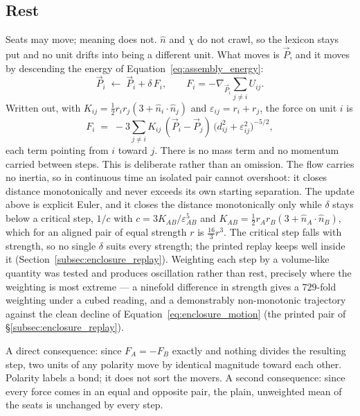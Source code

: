\documentclass[12pt, a4paper]{article}
\begin{document}
\subsection{Rest}
\label{subsec:enclosure_rest}
Seats may move; meaning does not. $\hat n$ and $\chi$ do not crawl,
so the lexicon stays put and no unit drifts into being a different
unit. What moves is $\vec P$, and it moves by descending the energy
of Equation~\eqref{eq:assembly_energy}:
\begin{equation}
    \vec P_i \;\leftarrow\; \vec P_i + \delta\,F_i,
    \qquad
    F_i = -\nabla_{\vec P_i}\!\!\sum_{j\ne i} U_{ij}.
    \label{eq:enclosure_motion}
\end{equation}
Written out, with $K_{ij}=\tfrac12 r_ir_j(3+\hat n_i\!\cdot\!\hat n_j)$ and $\varepsilon_{ij}=r_i+r_j$, the force on unit $i$ is
\[
    F_i \;=\; -3\sum_{j\ne i}K_{ij}\,(\vec P_i-\vec P_j)\,\bigl(d_{ij}^2+\varepsilon_{ij}^2\bigr)^{-5/2},
\]
each term pointing from $i$ toward $j$. There is no mass term and no momentum carried between steps. This
is deliberate rather than an omission. The flow carries no inertia, so in continuous time an isolated pair cannot overshoot: it closes distance monotonically and never exceeds its own starting separation. The update above is explicit Euler, and it closes the distance monotonically only while $\delta$ stays below a critical step, $1/c$ with $c=3K_{AB}/\varepsilon_{AB}^{5}$ and $K_{AB}=\tfrac12 r_Ar_B(3+\hat n_A\!\cdot\!\hat n_B)$, which for an aligned pair of equal strength $r$ is $\tfrac{16}{3}r^{3}$. The critical step falls with strength, so no single $\delta$ suits every strength; the printed replay keeps well inside it (Section~\ref{subsec:enclosure_replay}). Weighting each step by a volume-like quantity was tested and produces oscillation rather
than rest, precisely where the weighting is most extreme --- a
ninefold difference in strength gives a $729$-fold weighting under a
cubed reading, and a demonstrably non-monotonic trajectory against
the clean decline of Equation~\eqref{eq:enclosure_motion}
(the printed pair of \S\ref{subsec:enclosure_replay}).

A direct consequence: since $F_A=-F_B$ exactly and nothing divides
the resulting step, two units of any polarity move by identical
magnitude toward each other. Polarity labels a bond; it does not
sort the movers. A second consequence: since every force comes in an
equal and opposite pair, the plain, unweighted mean of the seats is unchanged by every step.
\end{document}
